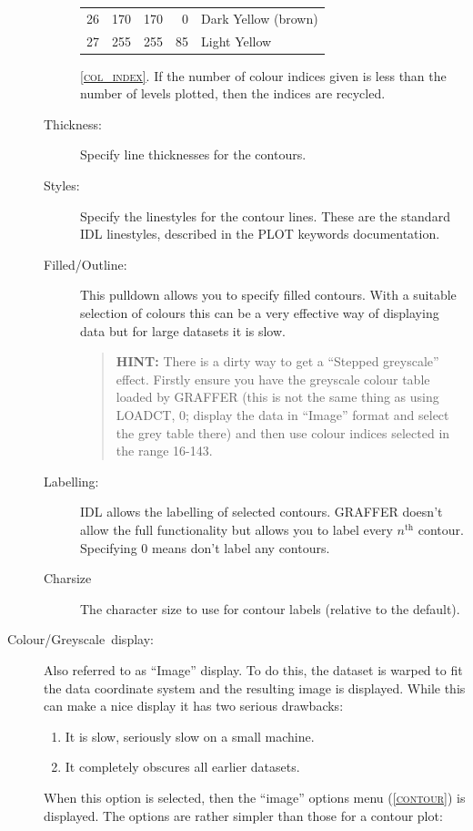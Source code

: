 \documentclass[11pt,twoside,english]{article}
\begin{document}
\begin{description}
\begin{description}
\begin{table}[!ht]
\begin{center}
\begin{tabular}{|c|rrr|l|}
          26 & 170 & 170 & 0 & Dark Yellow (brown)\\
          27 & 255 & 255 & 85 & Light Yellow\\
          \hline
        \end{tabular}
      \end{center}
    \end{table}
    \textsc{\autoref{col_index}}. If the number of colour indices given
    is less than the number of levels plotted, then the indices are
    recycled.
  \item [Thickness:]Specify line thicknesses for the contours.
  \item [Styles:]Specify the linestyles for the contour lines. These
    are the standard IDL linestyles, described in the PLOT keywords
    documentation.
  \item [Filled/Outline:]This pulldown allows you to specify filled
    contours.  With a suitable selection of colours this can be a very
    effective way of displaying data but for large datasets it is slow.

\begin{quote}
  \textsf{\textbf{HINT:}} \textsf{There is a dirty way to get a
    {}``Stepped greyscale'' effect. Firstly ensure you have the
    greyscale colour table loaded by GRAFFER (this is not the same
    thing as using LOADCT, 0; display the data in {}``Image'' format
    and select the grey table there) and then use colour indices
    selected in the range 16-143.}
\end{quote}
\item [Labelling:]IDL allows the labelling of selected
  contours. GRAFFER doesn't allow the full functionality but allows you
  to label every $n^{\mathrm{th}}$ contour. Specifying 0 means don't
  label any contours.
\item[Charsize] The character size to use for contour labels (relative
  to the default).
\end{description}
\item [Colour/Greyscale~display:]Also referred to as {}``Image''
  display.  To do this, the dataset is warped to fit the data
  coordinate system and the resulting image is displayed. While this
  can make a nice display it has two serious drawbacks:

  \begin{enumerate}
  \item It is slow, seriously slow on a small machine.
  \item It completely obscures all earlier datasets.
  \end{enumerate}
  When this option is selected, then the {}``image'' options menu
  (\textsc{\autoref{contour}}) is displayed. The options are rather
  simpler than those for a contour plot:


\end{description}
\end{document}
